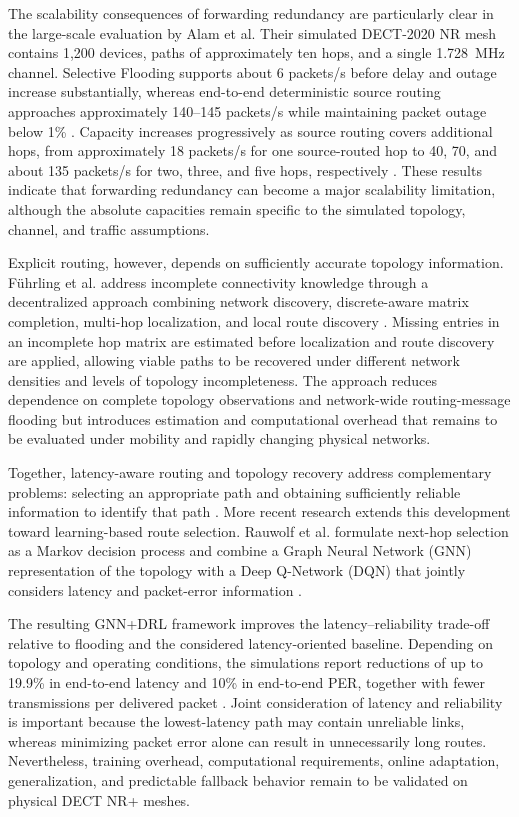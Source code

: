 The scalability consequences of forwarding redundancy are particularly clear in the large-scale evaluation by Alam et al. Their simulated DECT-2020 NR mesh contains 1,200 devices, paths of approximately ten hops, and a single 1.728~MHz channel. Selective Flooding supports about 6 packets/s before delay and outage increase substantially, whereas end-to-end deterministic source routing approaches approximately 140--145 packets/s while maintaining packet outage below 1\% \cite{alamDLRoutingPerformance2026a}. Capacity increases progressively as source routing covers additional hops, from approximately 18 packets/s for one source-routed hop to 40, 70, and about 135 packets/s for two, three, and five hops, respectively \cite{alamDLRoutingPerformance2026a}. These results indicate that forwarding redundancy can become a major scalability limitation, although the absolute capacities remain specific to the simulated topology, channel, and traffic assumptions.

Explicit routing, however, depends on sufficiently accurate topology information. F{\"u}hrling et al. address incomplete connectivity knowledge through a decentralized approach combining network discovery, discrete-aware matrix completion, multi-hop localization, and local route discovery \cite{fuhrlingRobustRoutingProtocol2025b}. Missing entries in an incomplete hop matrix are estimated before localization and route discovery are applied, allowing viable paths to be recovered under different network densities and levels of topology incompleteness. The approach reduces dependence on complete topology observations and network-wide routing-message flooding but introduces estimation and computational overhead that remains to be evaluated under mobility and rapidly changing physical networks.

Together, latency-aware routing and topology recovery address complementary problems: selecting an appropriate path and obtaining sufficiently reliable information to identify that path \cite{asifURLLCBasedMultiHopCommunication2025, fuhrlingRobustRoutingProtocol2025b}. More recent research extends this development toward learning-based route selection. Rauwolf et al. formulate next-hop selection as a Markov decision process and combine a Graph Neural Network (GNN) representation of the topology with a Deep Q-Network (DQN) that jointly considers latency and packet-error information \cite{rauwolfTopologyAwareDeepReinforcement2026a}.

The resulting GNN+DRL framework improves the latency--reliability trade-off relative to flooding and the considered latency-oriented baseline. Depending on topology and operating conditions, the simulations report reductions of up to 19.9\% in end-to-end latency and 10\% in end-to-end PER, together with fewer transmissions per delivered packet \cite{rauwolfTopologyAwareDeepReinforcement2026a}. Joint consideration of latency and reliability is important because the lowest-latency path may contain unreliable links, whereas minimizing packet error alone can result in unnecessarily long routes. Nevertheless, training overhead, computational requirements, online adaptation, generalization, and predictable fallback behavior remain to be validated on physical DECT NR+ meshes.

